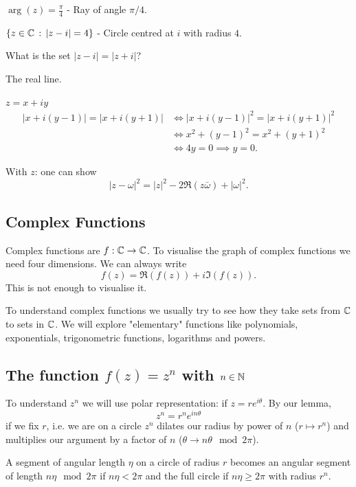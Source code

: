 \documentclass[10pt, a4paper]{article}
\begin{document}
$\arg(z) = \frac{\pi}{4}$ -
Ray of angle $\pi / 4$.

$\{z \in \mathbb{C}\,:\, |z - i| = 4\}$ -
Circle centred at $i$ with radius $4$.

\begin{example}
    What is the set $|z - i| = |z + i|$?

    \begin{solution}
        The real line.

        $z = x + iy$
        \begin{align*}
            |x + i(y - 1)| = |x + i(y + 1)| &\iff |x + i(y - 1)| ^ 2 = |x + i(y + 1)| ^ 2 \\
            &\iff x ^ 2 + (y - 1) ^ 2 = x ^ 2 + (y + 1) ^ 2 \\
            &\iff 4y = 0 \implies y = 0.
        \end{align*}

        With $z$:
        one can show
        \[
        |z - \omega| ^ 2 = |z| ^ 2 - 2\Re(z\bar{\omega}) + |\omega| ^ 2.
        \]
    \end{solution}
\end{example}

\subsection{Complex Functions}

Complex functions are $f : \mathbb{C} \to \mathbb{C}$.
To visualise the graph of complex functions we need four dimensions.
We can always write
\[
f(z) = \Re(f(z)) + i\Im(f(z)).
\]
This is not enough to visualise it.

To understand complex functions we usually try to see how they take sets from $\mathbb{C}$ to sets in $\mathbb{C}$.
We will explore
"elementary"
functions like polynomials,
exponentials,
trigonometric functions,
logarithms and powers.

\subsection{The function \texorpdfstring{$f(z) = z ^ n$}{} with \texorpdfstring{$n \in \mathbb{N}$}{}}
To understand $z ^ n$ we will use polar representation:
if $z = re ^ {i\theta}$.
By our lemma,
\[
z ^ n = r ^ ne ^ {in\theta}
\]
if we fix $r$,
i.e. we are on a circle $z ^ n$ dilates our radius by power of $n$
($r \mapsto r ^ n$) and multiplies our argument by a factor of $n$
($\theta \to n\theta\mod{2\pi}$).

A segment of angular length $\eta$ on a circle of radius $r$ becomes an angular segment of length $n\eta\mod{2\pi}$ if $n\eta < 2\pi$ and the full circle if $n\eta \geq 2\pi$ with radius $r ^ n$.
\end{document}
